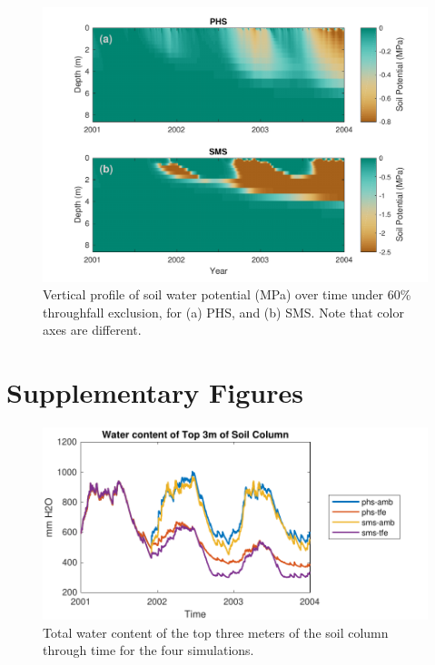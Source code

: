 \documentclass[draft,linenumbers]{agujournal}
\begin{document}
      \clearpage
    \begin{figure}[h]
     \centering
     \includegraphics[width=30pc]{../figs2/fig11.pdf}
     \caption{Vertical profile of soil water potential (MPa) over time under 60\% throughfall exclusion, for
     (a) PHS, and 
     (b) SMS.
     Note that color axes are different. }
     \label{fig11}
  \end{figure}
  
  
  



  


\clearpage

\appendix

\section{Supplementary Figures}

      \begin{figure}[h]
     \centering
     \includegraphics[width=30pc]{../figs2/top3m.pdf}
     \caption{Total water content of the top three meters of the soil column through time for the four simulations.}
     \label{top3m}
  \end{figure}
  \clearpage
\end{document}
